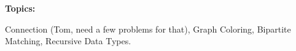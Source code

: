 \documentclass[handout]{mcs}
\begin{document}
\renewcommand{\reading}{Notes Ch.~\bref{trees-sec}--~\bref{bipartitesec};
  Ch.~\bref{digraphs_sec}}


\begin{staffnotes}
\textbf{Topics:}

Connection (Tom, need a few problems for that), Graph Coloring, Bipartite Matching,
Recursive Data Types.

\end{staffnotes}







\end{document}
